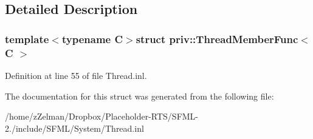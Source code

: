 \subsection{Detailed Description}
\subsubsection*{template$<$typename C$>$struct priv\-::\-Thread\-Member\-Func$<$ C $>$}



Definition at line 55 of file Thread.\-inl.



The documentation for this struct was generated from the following file\-:\begin{DoxyCompactItemize}
\item 
/home/z\-Zelman/\-Dropbox/\-Placeholder-\/\-R\-T\-S/\-S\-F\-M\-L-\/2./include/\-S\-F\-M\-L/\-System/Thread.\-inl\end{DoxyCompactItemize}
